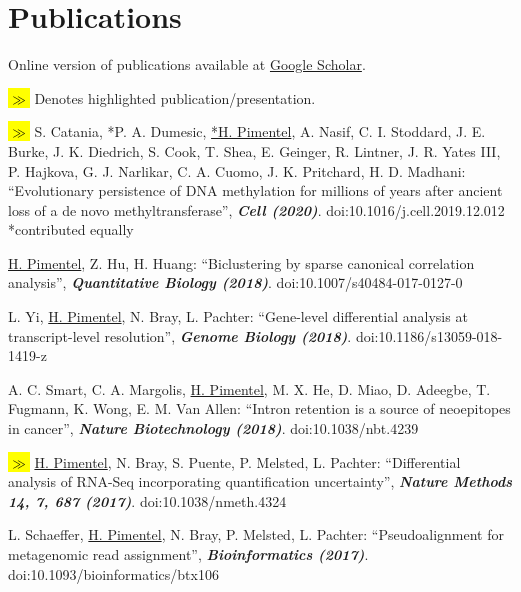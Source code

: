 \documentclass[11pt,notitlepage]{article} %
\newcommand{\hlc}[2][blue]{ {\sethlcolor{#1} \hl{#2}} }
\newcommand{\hlpub}{\hlc[Dandelion]{{\color{white}$\gg$} }}
\begin{document}
  \newpage
\section*{Publications}
\bigskip
Online version of publications available at \href{https://scholar.google.com/citations?user=WfzyRAUAAAAJ&hl=en}{Google Scholar}.

\bigskip

\hlpub{} Denotes highlighted publication/presentation.

\bigskip


\begin{etaremune}

  \item\hlpub{} S. Catania, *P. A. Dumesic, \underline{*H. Pimentel}, A. Nasif, C. I. Stoddard, J. E. Burke, J. K. Diedrich, S. Cook, T. Shea, E. Geinger, R. Lintner, J. R. Yates III, P. Hajkova, G. J. Narlikar, C. A. Cuomo, J. K. Pritchard, H. D. Madhani: ``Evolutionary persistence of DNA methylation for millions of years after ancient loss of a de novo methyltransferase'', {\bf \emph{Cell (2020)}}. doi:10.1016/j.cell.2019.12.012 *contributed equally

  \item \underline{H. Pimentel}, Z. Hu, H. Huang: ``Biclustering by sparse
canonical correlation analysis'', {\bf \emph{Quantitative Biology (2018)}}. doi:10.1007/s40484-017-0127-0

  \item L. Yi, \underline{H. Pimentel}, N. Bray, L. Pachter: ``Gene-level differential analysis at transcript-level resolution'', {\bf \emph{Genome Biology (2018)}}. doi:10.1186/s13059-018-1419-z

  \item A. C. Smart, C. A. Margolis, \underline{H. Pimentel}, M. X. He, D. Miao, D. Adeegbe, T. Fugmann, K. Wong, E. M. Van Allen: ``Intron retention is a source of neoepitopes in cancer'',  {\bf \emph{Nature Biotechnology (2018)}}. doi:10.1038/nbt.4239

  \item\hlpub{}\underline{H. Pimentel}, N. Bray, S. Puente, P. Melsted, L. Pachter:  ``Differential analysis of RNA-Seq incorporating quantification uncertainty'', {\bf \emph{Nature Methods 14, 7, 687 (2017)}}. doi:10.1038/nmeth.4324

  \item L. Schaeffer, \underline{H. Pimentel}, N. Bray, P. Melsted, L. Pachter: ``Pseudoalignment for metagenomic read assignment'', {\bf \emph{Bioinformatics (2017)}}. doi:10.1093/bioinformatics/btx106


\end{etaremune}
\end{document}
